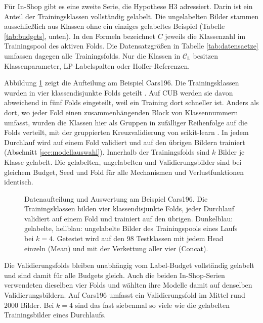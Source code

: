 

Für In-Shop gibt es eine zweite Serie, die Hypothese H3 adressiert. Darin ist ein Anteil der Trainingsklassen vollständig gelabelt. Die ungelabelten Bilder stammen ausschließlich aus Klassen ohne ein einziges gelabeltes Beispiel (Tabelle \ref{tab:budgets}, unten). In den Formeln bezeichnet $C$ jeweils die Klassenzahl im Trainingspool des aktiven Folds. Die Datensatzgrößen in Tabelle \ref{tab:datensaetze} umfassen dagegen alle Trainingsfolds. Nur die Klassen in $\mathcal{C}_{\mathrm{L}}$ besitzen Klassenparameter, \ac{LP}-Labelspalten oder Hoffer-Referenzen.

Abbildung \ref{fig:protokoll} zeigt die Aufteilung am Beispiel Cars196. Die Trainingsklassen wurden in vier klassendisjunkte Folds geteilt \cite{musgrave_metric_2020}. Auf \ac{CUB} werden sie davon abweichend in fünf Folds eingeteilt, weil ein Training dort schneller ist. Anders als dort, wo jeder Fold einen zusammenhängenden Block von Klassennummern umfasst, wurden die Klassen hier als Gruppen in zufälliger Reihenfolge auf die Folds verteilt, mit der gruppierten Kreuzvalidierung von scikit-learn \cite{pedregosa_scikit-learn_2011}. In jedem Durchlauf wird auf einem Fold validiert und auf den übrigen Bildern trainiert (Abschnitt \ref{sec:modellauswahl}). Innerhalb der Trainingsfolds sind $k$ Bilder je Klasse gelabelt. Die gelabelten, ungelabelten und Validierungsbilder sind bei gleichem Budget, Seed und Fold für alle Mechanismen und Verlustfunktionen identisch. 

\begin{figure}[tbp]
  \centering
  
  \caption[Datenaufteilung und Auswertung]{Datenaufteilung und Auswertung am Beispiel Cars196. Die Trainingsklassen bilden vier klassendisjunkte Folds, jeder Durchlauf validiert auf einem Fold und trainiert auf den übrigen. Dunkelblau: gelabelte, hellblau: ungelabelte Bilder des Trainingspools eines Laufs bei $k=4$. Getestet wird auf den 98 Testklassen mit jedem Head einzeln (Mean) und mit der Verkettung aller vier (Concat).}
  \label{fig:protokoll}
\end{figure}

Die Validierungsfolds bleiben unabhängig vom Label-Budget vollständig gelabelt und sind damit für alle Budgets gleich. Auch die beiden In-Shop-Serien verwendeten dieselben vier Folds und wählten ihre Modelle damit auf denselben Validierungsbildern. Auf Cars196 umfasst ein Validierungsfold im Mittel rund 2000 Bilder. Bei $k=4$ sind das fast siebenmal so viele wie die gelabelten Trainingsbilder eines Durchlaufs. 

